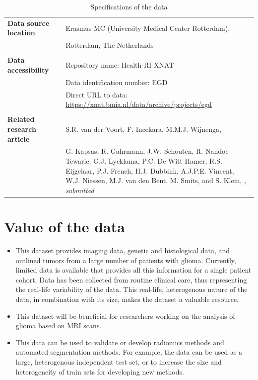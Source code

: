 \begin{table}[htbp]
\begin{tabular}{L{4cm}C{0.2cm}L{8cm}}
\textbf{Data source location}  && Erasmus MC (University Medical Center Rotterdam),\\
&& Rotterdam, The Netherlands\\
\\
\textbf{Data accessibility}   && Repository name: Health-RI XNAT\\
                         &&Data identification number: EGD\\
                         &&Direct URL to data: \url{https://xnat.bmia.nl/data/archive/projects/egd}\\
\\
\textbf{Related research article} &&  S.R. van der Voort, F. Incekara, M.M.J. Wijnenga,\\
&&G. Kapsas, R. Gahrmann, J.W. Schouten, R. Nandoe Tewarie, G.J. Lycklama, P.C. De Witt Hamer, R.S. Eijgelaar, P.J. French, H.J. Dubbink, A.J.P.E. Vincent, W.J. Niessen, M.J. van den Bent, M. Smits, and S. Klein, , \textit{submitted}\\
\bottomrule
\end{tabular}
\caption{Specifications of the data}\label{tab:egd_specifications}
\end{table}


\section{Value of the data}

\begin{itemize}
\itemsep=0pt
\parsep=0pt
\item This dataset provides imaging data, genetic and histological data, and outlined \glspl{tumor} from a large number of patients with glioma.
Currently, limited data is available that provides all this information for a single patient cohort.
Data has been collected from routine clinical care, thus representing the real-life variability of the data.
This real-life, heterogenous nature of the data, in combination with its size, makes the dataset a valuable resource.
\item This dataset will be beneficial for researchers working on the analysis of glioma based on \acrshort{MRI} scans.
\item This data can be used to validate or develop radiomics methods and automated segmentation methods.
For example, the data can be used as a large, heterogenous independent test set, or to increase the size and heterogeneity of train sets for developing new methods.
\end{itemize}


